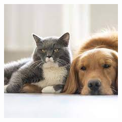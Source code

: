 \begin{figure}[H]
\begin{minipage}{0.3\textwidth}
 \includegraphics[width=\textwidth]{Graphics/Images/image_9.jpg}
 \caption{ }
 \label{fig:9}
\end{minipage}
\end{figure}


